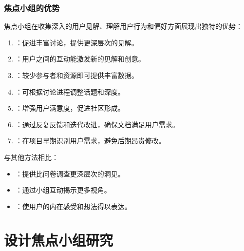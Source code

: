 \documentclass[letterpaper,10pt,english]{sphinxmanual}
\begin{document}
\subsubsection{焦点小组的优势}
\label{\detokenize{user-research/focus-group:id9}}
\sphinxAtStartPar
焦点小组在收集深入的用户见解、理解用户行为和偏好方面展现出独特的优势：
\begin{enumerate}
%
\item {} 
\sphinxAtStartPar
{}：促进丰富讨论，提供更深层次的见解。

\item {} 
\sphinxAtStartPar
{}：用户之间的互动能激发新的见解和创意。

\item {} 
\sphinxAtStartPar
{}：较少参与者和资源即可提供丰富数据。

\item {} 
\sphinxAtStartPar
{}：可根据讨论进程调整话题和深度。

\item {} 
\sphinxAtStartPar
{}：增强用户满意度，促进社区形成。

\item {} 
\sphinxAtStartPar
{}：通过反复反馈和迭代改进，确保文档满足用户需求。

\item {} 
\sphinxAtStartPar
{}：在项目早期识别用户需求，避免后期昂贵修改。

\end{enumerate}

\sphinxAtStartPar
与其他方法相比：
\begin{itemize}
\item {} 
\sphinxAtStartPar
{}：提供比问卷调查更深层次的洞见。

\item {} 
\sphinxAtStartPar
{}：通过小组互动揭示更多视角。

\item {} 
\sphinxAtStartPar
{}：使用户的内在感受和想法得以表达。

\end{itemize}


\section{设计焦点小组研究}
\label{\detokenize{user-research/focus-group:id10}}
\end{document}
